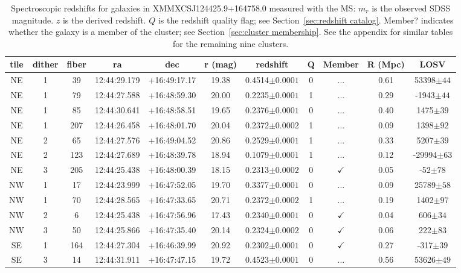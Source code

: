 \begin{table*}
	\centering \caption{Spectroscopic redshifts for galaxies in XMMXCSJ124425.9+164758.0 measured with the MS: $m_r$ is the observed SDSS \sdssr\ magnitude. $z$ is the derived redshift. $Q$ is the redshift quality flag; see Section~\ref{sec:redshift catalog}. Member? indicates whether the galaxy is a member of the cluster; see Section~\ref{sec:cluster membership}. See the appendix for similar tables for the remaining nine clusters.}
	\begin{tabular}{ccccccccccc}
		\hline
		tile & dither & fiber & ra & dec & r (mag) & redshift & Q & Member & R (Mpc) & LOSV \\
		\hline \hline
NE & 1 & 39 & 12:44:29.179 & +16:49:17.17 & 19.38 & 0.4514$\pm{0.0001}$ & 0 & ... & 0.61 & 53398$\pm{44}$ \\
NE & 1 & 79 & 12:44:27.588 & +16:48:59.30 & 20.00 & 0.2235$\pm{0.0001}$ & 1 & ... & 0.29 & -1943$\pm{44}$ \\
NE & 1 & 85 & 12:44:30.641 & +16:48:58.51 & 19.65 & 0.2376$\pm{0.0001}$ & 0 & ... & 0.40 & 1475$\pm{39}$ \\
NE & 1 & 207 & 12:44:26.458 & +16:48:01.70 & 20.04 & 0.2372$\pm{0.0002}$ & 1 & ... & 0.09 & 1398$\pm{92}$ \\
NE & 2 & 65 & 12:44:27.576 & +16:49:04.52 & 20.86 & 0.2529$\pm{0.0001}$ & 1 & ... & 0.33 & 5207$\pm{39}$ \\
NE & 2 & 123 & 12:44:27.689 & +16:48:39.78 & 18.94 & 0.1079$\pm{0.0001}$ & 1 & ... & 0.12 & -29994$\pm{63}$ \\
NE & 3 & 205 & 12:44:25.438 & +16:48:00.39 & 18.15 & 0.2313$\pm{0.0002}$ & 0 & $\checkmark$ & 0.05 & -52$\pm{78}$ \\
NW & 1 & 17 & 12:44:23.999 & +16:47:52.05 & 19.70 & 0.3377$\pm{0.0001}$ & 0 & ... & 0.09 & 25789$\pm{58}$ \\
NW & 1 & 70 & 12:44:28.565 & +16:47:33.65 & 20.71 & 0.2372$\pm{0.0002}$ & 1 & ... & 0.19 & 1402$\pm{97}$ \\
NW & 2 & 6 & 12:44:25.438 & +16:47:56.96 & 17.43 & 0.2340$\pm{0.0001}$ & 0 & $\checkmark$ & 0.04 & 606$\pm{34}$ \\
NW & 3 & 50 & 12:44:25.866 & +16:47:35.40 & 20.14 & 0.2324$\pm{0.0002}$ & 0 & $\checkmark$ & 0.06 & 222$\pm{83}$ \\
SE & 1 & 164 & 12:44:27.304 & +16:46:39.99 & 20.92 & 0.2302$\pm{0.0001}$ & 0 & $\checkmark$ & 0.27 & -317$\pm{39}$ \\
SE & 3 & 14 & 12:44:31.911 & +16:47:47.15 & 19.72 & 0.4523$\pm{0.0001}$ & 0 & ... & 0.56 & 53626$\pm{49}$ \\

\end{tabular}
\end{table*}
